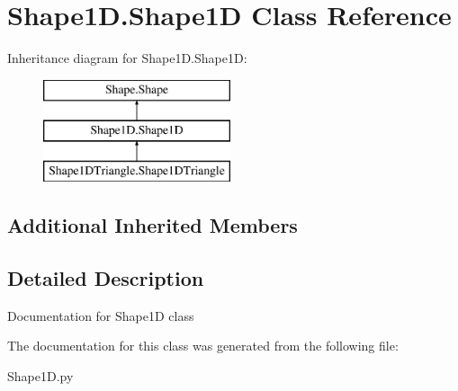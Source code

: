 \hypertarget{classShape1D_1_1Shape1D}{\section{Shape1\-D.\-Shape1\-D Class Reference}
\label{classShape1D_1_1Shape1D}
}
Inheritance diagram for Shape1\-D.\-Shape1\-D\-:\begin{figure}[H]
\begin{center}
\leavevmode
\includegraphics[height=3.000000cm]{classShape1D_1_1Shape1D}
\end{center}
\end{figure}
\subsection*{Additional Inherited Members}


\subsection{Detailed Description}
\begin{DoxyVerb}Documentation for Shape1D class
\end{DoxyVerb}
 

The documentation for this class was generated from the following file\-:\begin{DoxyCompactItemize}
\item 
Shape1\-D.\-py\end{DoxyCompactItemize}
